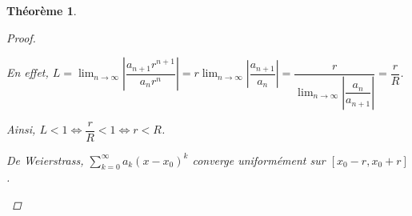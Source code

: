\documentclass{report}
\newcommand*{\dsum}[4]{\displaystyle\sum_{#1=#2}^{#3}#4}
\newcommand*{\dlim}[3]{\displaystyle\lim_{#1 \to #2}#3}
\newcommand*{\abs}[1]{\left| #1 \right|}
\newtheorem*{thm}{Th\'eor\`eme}
\theoremstyle{definition}
\theoremstyle{remark}
\begin{document}
\begin{thm}
\begin{proof}
\begin{enumerate}[label=\alph*)]
\begin{enumerate}[label=\roman*)]
					En effet, $L = \dlim{n}{\infty}{\abs{\dfrac{a_{n+1}r^{n+1}}{a_nr^n}}} = r \dlim{n}{\infty}{\abs{\dfrac{a_{n+1}}{a_n}}} = \dfrac{r}{\dlim{n}{\infty}{\abs{\dfrac{a_n}{a_{n+1}}}}} = \dfrac{r}{R}$.

					Ainsi, $L<1 \Leftrightarrow \dfrac{r}{R}<1 \Leftrightarrow r<R$.
				\end{enumerate}

				De Weierstrass, $\dsum{k}{0}{\infty}{a_k(x-x_0)^k}$ converge uniform\'ement sur $[x_0-r, x_0+r]$.
			\end{enumerate}
		\end{proof}
	\end{thm}
\end{document}
